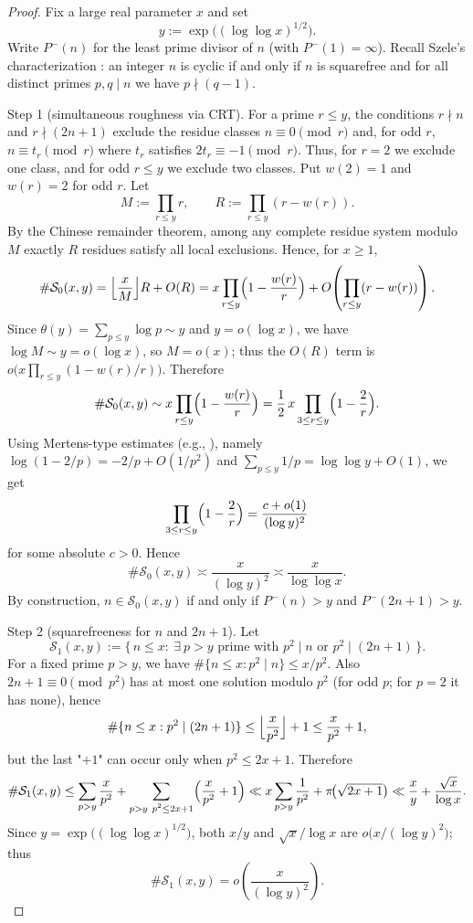 \documentclass[12pt]{article}
\theoremstyle{remark}
\begin{document}
\begin{proof}
Fix a large real parameter $x$ and set
$$y:=\exp\bigl((\log\log x)^{1/2}\bigr).$$
Write $P^-(n)$ for the least prime divisor of $n$ (with $P^-(1)=\infty$). Recall Szele's characterization \cite{Szele1947}: an integer $n$ is cyclic if and only if $n$ is squarefree and for all distinct primes $p,q\mid n$ we have $p\nmid(q-1)$.

Step 1 (simultaneous roughness via CRT). For a prime $r\le y$, the conditions $r\nmid n$ and $r\nmid(2n+1)$ exclude the residue classes $n\equiv0\pmod r$ and, for odd $r$, $n\equiv t_r\pmod r$ where $t_r$ satisfies $2t_r\equiv-1\pmod r$. Thus, for $r=2$ we exclude one class, and for odd $r\le y$ we exclude two classes. Put $w(2)=1$ and $w(r)=2$ for odd $r$. Let
$$M:=\prod_{r\le y} r,\qquad R:=\prod_{r\le y}(r-w(r)).$$
By the Chinese remainder theorem, among any complete residue system modulo $M$ exactly $R$ residues satisfy all local exclusions. Hence, for $x\ge1$,
$$\#\mathcal S_0(x,y)=\Bigl\lfloor\frac{x}{M}\Bigr\rfloor R+O(R)
= x\prod_{r\le y}\Bigl(1-\frac{w(r)}{r}\Bigr)+O\!\left(\prod_{r\le y}(r-w(r))\right).$$
Since $\theta(y)=\sum_{p\le y}\log p\sim y$ and $y=o(\log x)$, we have $\log M\sim y=o(\log x)$, so $M=o(x)$; thus the $O(R)$ term is $o\bigl(x\prod_{r\le y}(1-w(r)/r)\bigr)$. Therefore
$$\#\mathcal S_0(x,y)\sim x\prod_{r\le y}\Bigl(1-\frac{w(r)}{r}\Bigr)=\frac{1}{2}\,x\prod_{3\le r\le y}\Bigl(1-\frac{2}{r}\Bigr).$$
Using Mertens-type estimates (e.g., \cite{Apostol1976}), namely $\log(1-2/p)=-2/p+O(1/p^2)$ and $\sum_{p\le y}1/p=\log\log y+O(1)$, we get
$$\prod_{3\le r\le y}\Bigl(1-\frac{2}{r}\Bigr)=\frac{c+o(1)}{(\log y)^2}$$
for some absolute $c>0$. Hence
$$\#\mathcal S_0(x,y)\asymp \frac{x}{(\log y)^2}\asymp \frac{x}{\log\log x}.$$
By construction, $n\in\mathcal S_0(x,y)$ if and only if $P^-(n)>y$ and $P^-(2n+1)>y$.

Step 2 (squarefreeness for $n$ and $2n+1$). Let
$$\mathcal S_1(x,y):=\{\,n\le x:\ \exists\ p>y\text{ prime with }p^2\mid n\text{ or }p^2\mid(2n+1)\,\}.$$
For a fixed prime $p>y$, we have $\#\{n\le x: p^2\mid n\}\le x/p^2$. Also $2n+1\equiv0\pmod{p^2}$ has at most one solution modulo $p^2$ (for odd $p$; for $p=2$ it has none), hence
$$\#\{n\le x: p^2\mid(2n+1)\}\le \Bigl\lfloor\frac{x}{p^2}\Bigr\rfloor+1\le \frac{x}{p^2}+1,$$
but the last "$+1$" can occur only when $p^2\le 2x+1$. Therefore
\[
\#\mathcal S_1(x,y)\le \sum_{p>y}\frac{x}{p^2}+\sum_{\substack{p>y\ p^2\le 2x+1}}\Bigl(\frac{x}{p^2}+1\Bigr)
\ll x\sum_{p>y}\frac{1}{p^2}+\pi\!\bigl(\sqrt{2x+1}\bigr)
\ll \frac{x}{y}+\frac{\sqrt{x}}{\log x}.
\]
Since $y=\exp\bigl((\log\log x)^{1/2}\bigr)$, both $x/y$ and $\sqrt{x}/\log x$ are $o\bigl(x/(\log y)^2\bigr)$; thus
$$\#\mathcal S_1(x,y)=o\!\left(\frac{x}{(\log y)^2}\right).$$


\end{proof}
\end{document}

